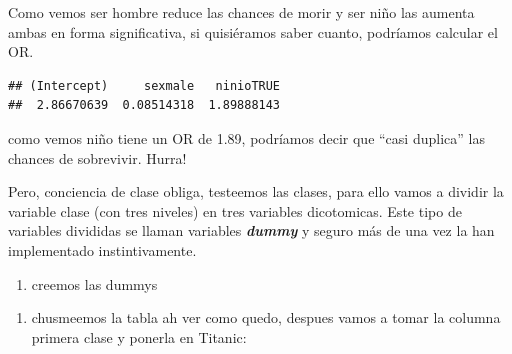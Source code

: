 \documentclass[
]{book}
\newenvironment{Shaded}{\begin{snugshade}}{\end{snugshade}}
\newcommand{\AttributeTok}[1]{\textcolor[rgb]{0.77,0.63,0.00}{#1}}
\newcommand{\FunctionTok}[1]{\textcolor[rgb]{0.00,0.00,0.00}{#1}}
\newcommand{\NormalTok}[1]{#1}
\newcommand{\OtherTok}[1]{\textcolor[rgb]{0.56,0.35,0.01}{#1}}
\newcommand{\SpecialCharTok}[1]{\textcolor[rgb]{0.00,0.00,0.00}{#1}}
\newcommand{\StringTok}[1]{\textcolor[rgb]{0.31,0.60,0.02}{#1}}
\providecommand{\tightlist}{%
  \setlength{\itemsep}{0pt}\setlength{\parskip}{0pt}}
\begin{document}
Como vemos ser hombre reduce las chances de morir y ser niño las aumenta ambas en forma significativa, si quisiéramos saber cuanto, podríamos calcular el OR.

\begin{Shaded}
\end{Shaded}

\begin{verbatim}
## (Intercept)     sexmale   ninioTRUE 
##  2.86670639  0.08514318  1.89888143
\end{verbatim}

como vemos niño tiene un OR de 1.89, podríamos decir que ``casi duplica'' las chances de sobrevivir. Hurra!

Pero, conciencia de clase obliga, testeemos las clases, para ello vamos a dividir la variable clase (con tres niveles) en tres variables dicotomicas. Este tipo de variables divididas se llaman variables \textbf{\emph{dummy}} y seguro más de una vez la han implementado instintivamente.

\begin{enumerate}
\def\labelenumi{\arabic{enumi}.}
\tightlist
\item
  creemos las dummys
\end{enumerate}

\begin{Shaded}
\end{Shaded}

\begin{enumerate}
\def\labelenumi{\arabic{enumi}.}
\setcounter{enumi}{1}
\tightlist
\item
  chusmeemos la tabla ah ver como quedo, despues vamos a tomar la columna primera clase y ponerla en Titanic:
\end{enumerate}

\begin{Shaded}
\end{Shaded}
\end{document}
